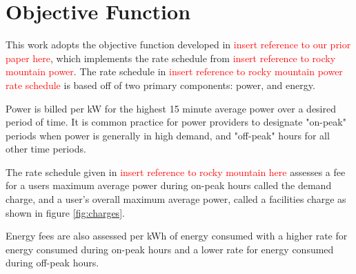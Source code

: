 \section{Objective Function\label{sec:objective}}
This work adopts the objective function developed in \textcolor{red}{insert reference to our prior paper here}, which implements the rate schedule from \textcolor{red}{insert reference to rocky mountain power}. The rate schedule in \textcolor{red}{insert reference to rocky mountain power rate schedule} is based off of two primary components: power, and energy.  
\par Power is billed per kW for the highest 15 minute average power over a desired period of time. It is common practice for power providers to designate "on-peak" periods when power is generally in high demand, and "off-peak" hours for all other time periods. 
\par The rate schedule given in \textcolor{red}{insert reference to rocky mountain here} assesses a fee for a users maximum average power during on-peak hours called the demand charge, and a user's overall maximum average power, called a facilities charge as shown in figure \ref{fig:charges}. 
\par Energy fees are also assessed per kWh of energy consumed with a higher rate for energy consumed during on-peak hours and a lower rate for energy consumed during off-peak hours.

